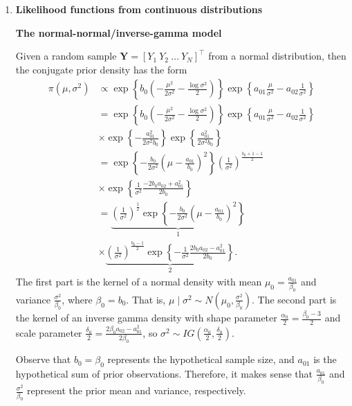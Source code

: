 \begin{enumerate}
\item \textbf{Likelihood functions from continuous distributions}

\textbf{The normal-normal/inverse-gamma model}

Given a random sample $\bm{Y}=[Y_1 \ Y_2 \ \dots \ Y_N]^{\top}$ from a normal distribution, then the conjugate prior density has the form 
\begin{align}
	\pi(\mu,\sigma^2)&\propto \exp\left\{b_0\left(-\frac{\mu^2}{2\sigma^2}-\frac{\log \sigma^2}{2}\right)\right\}\exp\left\{a_{01}\frac{\mu}{\sigma^2}-a_{02}\frac{1}{\sigma^2}\right\}\nonumber\\
	&=\exp\left\{b_0\left(-\frac{\mu^2}{2\sigma^2}-\frac{\log \sigma^2}{2}\right)\right\}\exp\left\{a_{01}\frac{\mu}{\sigma^2}-a_{02}\frac{1}{\sigma^2}\right\}\nonumber\\
	&\times \exp\left\{-\frac{a_{01}^2}{2\sigma^2b_0}\right\}\exp\left\{\frac{a_{01}^2}{2\sigma^2b_0}\right\}\nonumber\\
	&=\exp\left\{-\frac{b_0}{2\sigma^2}\left(\mu-\frac{a_{01}}{b_0}\right)^2\right\}\left(\frac{1}{\sigma^2}\right)^{\frac{b_0+1-1}{2}}\nonumber\\
	&\times \exp\left\{\frac{1}{\sigma^2}\frac{-2b_0a_{02}+a_{01}^2}{2b_0}\right\}\nonumber\\
	&=\underbrace{\left(\frac{1}{\sigma^2}\right)^{\frac{1}{2}}\exp\left\{-\frac{b_0}{2\sigma^2}\left(\mu-\frac{a_{01}}{b_0}\right)^2\right\}}_{1}\nonumber\\
	&\times\underbrace{\left(\frac{1}{\sigma^2}\right)^{\frac{b_0-1}{2}}\exp\left\{-\frac{1}{\sigma^2}\frac{2b_0a_{02}-a_{01}^2}{2b_0}\right\}}_{2}.\nonumber
\end{align}
The first part is the kernel of a normal density with mean \( \mu_0 = \frac{a_{01}}{\beta_0} \) and variance \( \frac{\sigma^2}{\beta_0} \), where \( \beta_0 = b_0 \). That is, \( \mu \mid \sigma^2 \sim N\left(\mu_0, \frac{\sigma^2}{\beta_0}\right) \). The second part is the kernel of an inverse gamma density with shape parameter \( \frac{\alpha_0}{2} = \frac{\beta_0 - 3}{2} \) and scale parameter \( \frac{\delta_0}{2} = \frac{2\beta_0 a_{02} - a_{01}^2}{2\beta_0} \), so \( \sigma^2 \sim IG\left(\frac{\alpha_0}{2}, \frac{\delta_0}{2}\right) \).

Observe that \( b_0 = \beta_0 \) represents the hypothetical sample size, and \( a_{01} \) is the hypothetical sum of prior observations. Therefore, it makes sense that \( \frac{a_{01}}{\beta_0} \) and \( \frac{\sigma^2}{\beta_0} \) represent the prior mean and variance, respectively.


\end{enumerate}
